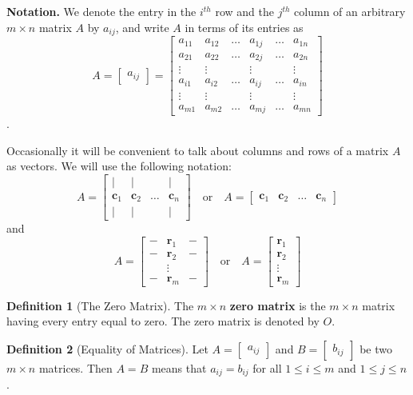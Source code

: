 \documentclass[12pt]{amsart}
\theoremstyle{definition}
\newtheorem*{definition}{Definition}
\begin{document}
\begin{enumerate}[itemsep=0.8em,leftmargin=0pt]
\noindent \textbf{Notation.} We denote the entry in the $i^{th}$ row  and the $j^{th}$ column of an arbitrary $m\times n$ matrix $A$ by $a_{ij}$, and write $A$ in terms of its entries
as $$A= \begin{bmatrix} a_{ij} \end{bmatrix}=\begin{bmatrix}
           a_{11} & a_{12}&\dots&a_{1j}&\dots&a_{1n}\\
           a_{21}&a_{22} &\dots&a_{2j}&\dots &a_{2n}\\
		\vdots & \vdots&&\vdots&&\vdots\\
        a_{i1}&a_{i2}&\dots &a_{ij}&\dots &a_{in}\\
        \vdots & \vdots&&\vdots&&\vdots\\
		a_{m1}&a_{m2}&\dots &a_{mj}&\dots &a_{mn}
         \end{bmatrix}$$. 

Occasionally it will be convenient to talk about columns and rows of a matrix $A$ as vectors.  We will use the following notation:
    $$A=\begin{bmatrix}|&|&&|\\\mathbf{c}_1& \mathbf{c}_2 &\ldots & \mathbf{c}_n\\|&|&&|\end{bmatrix}\quad\text{or}\quad A=\begin{bmatrix}\mathbf{c}_1& \mathbf{c}_2 &\ldots & \mathbf{c}_n\end{bmatrix}$$
and
    $$A=\begin{bmatrix}
    - & \mathbf{r}_1 & - \\ - & \mathbf{r}_2 & - \\ & \vdots & \\ - & \mathbf{r}_m & -
    \end{bmatrix}\quad\text{or}\quad A=\begin{bmatrix}\mathbf{r}_1\\\mathbf{r}_2\\\vdots\\\mathbf{r}_m\end{bmatrix}$$

\begin{definition}[The Zero Matrix]\label{def:zeromatrix}
The $m\times n$ \textbf{zero matrix} is the $m\times n$ matrix
having every entry equal to zero. The zero matrix is
denoted by $O$.
\end{definition}

\begin{definition}[Equality of Matrices]\label{def:equalityofmatrices}
 Let $A=\begin{bmatrix} a_{ij}\end{bmatrix}$ and $B=\begin{bmatrix} b_{ij}\end{bmatrix}$ be two $m \times n$ matrices. Then $A=B$ means
that $a_{ij}=b_{ij}$ for all $1\leq i\leq m$ and 
$1\leq j\leq n$.
\end{definition}


\end{enumerate}
\end{document}
